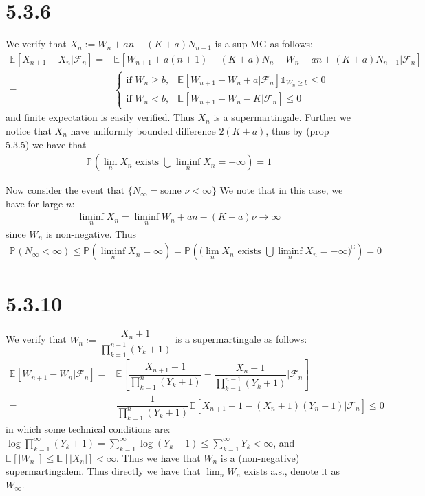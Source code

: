 \documentclass[11pt,a4paper]{ctexart}
\numberwithin{equation}{section}%
\newcommand{\F}{\mathcal{F}}
\begin{document}
    

\section{5.3.6}


We verify that $ X_n := W_n+an-(K+a)N_{n-1} $ is a sup-MG as follows:
\begin{align*}
    \mathbb{E}_{  }\left[ X_{n+1}-X_n | \F_n \right] =& \mathbb{E}_{  }\left[ W_{n+1}+a(n+1)-(K+a)N_n - W_n-an+(K+a)N_{n-1} | \F_n \right] \\  
    =& \begin{cases}
        \text{if }W_n \geq b,& \mathbb{E}_{  }\left[ W_{n+1}-W_n + a | \F_n \right] \mathbb{1}_{W_n \geq b} \leq 0\\
        \text{if }W_n < b,& \mathbb{E}_{  }\left[ W_{n+1}-W_n - K | \F_n \right] \leq 0
    \end{cases}
\end{align*}
and finite expectation is easily verified. Thus $ X_n $ is a supermartingale. Further we notice that $ X_n $ have uniformly bounded difference $ 2(K+a) $, thus by (prop 5.3.5) we have that
\begin{align*}
    \mathbb{P}_{  }\left( \lim_n X_n \text{ exists }\bigcup \liminf_n X_n = -\infty \right) = 1  
\end{align*}

Now consider the event that $ \{N_\infty = \text{some } \nu < \infty  \} $ We note that in this case, we have for large $ n $:
\begin{align*}
    \liminf_n X_n = \liminf_n W_n + an - (K+a)\nu \to \infty
\end{align*}
since $ W_n $ is non-negative. Thus
\begin{align*}
    \mathbb{P}_{  }\left( N_\infty < \infty \right)  \leq \mathbb{P}_{  }\left( \liminf_n X_n = \infty  \right) = \mathbb{P}_{  }\left( \big(\lim_n X_n \text{ exists }\bigcup \liminf_n X_n = -\infty\big)^\complement \right) = 0 
\end{align*}

\section{5.3.10}

We verify that $ W_n:=\dfrac{ X_n + 1 }{ \prod_{k=1}^{n-1}(Y_k+1) }  $ is a supermartingale as follows:
\begin{align*}
    \mathbb{E}_{  }\left[ W_{n+1} - W_n | \F_n \right] =& \mathbb{E}_{  }\left[  \dfrac{ X_{n+1} + 1 }{ \prod_{k=1}^{n}(Y_k+1) } - \dfrac{ X_n + 1 }{ \prod_{k=1}^{n-1}(Y_k+1) } | \F_n \right] \\
    =& \dfrac{ 1 }{ \prod_{k=1}^{n}(Y_k+1) } \mathbb{E}_{  }\left[  X_{n+1} + 1 - (X_n+1)(Y_n+1)  | \F_n \right] \leq 0
\end{align*}
in which some technical conditions are: $ \log \prod_{k=1}^\infty (Y_k+1)=\sum_{k=1}^\infty \log (Y_k+1)\leq \sum_{k=1}^\infty Y_k <\infty $, and $ \mathbb{E}_{  }\left[ \left\vert W_n \right\vert  \right]  \leq \mathbb{E}_{  }\left[ \left\vert X_n \right\vert  \right] <\infty   $. Thus we have that $ W_n $ is a (non-negative) supermartingalem. Thus directly we have that $ \lim_n W_n $ exists a.s., denote it as $ W_\infty $.
\end{document}
